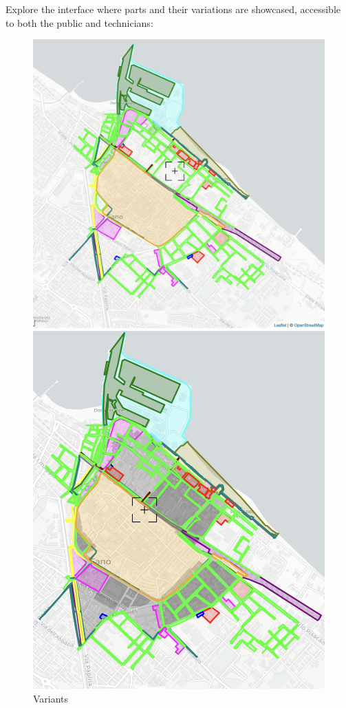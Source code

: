Explore the interface where parts and their variations are showcased, accessible to both the public and technicians:
\begin{figure}[H]
    \centering
    \begin{minipage}{0.48\textwidth}
        \centering
        \includegraphics[width=\textwidth]{res/web/map-data}
        \caption{Variants}
        \label{fig:web-map-data}
    \end{minipage}
    \hfill
    \begin{minipage}{0.48\textwidth}
        \centering
        \includegraphics[width=\textwidth]{res/web/both-map-data}

\end{minipage}
\end{figure}
